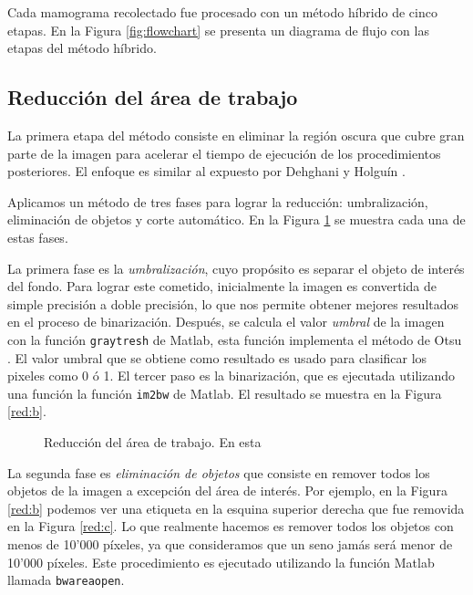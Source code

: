 Cada mamograma recolectado fue procesado con un método híbrido de cinco etapas.
En la Figura \ref{fig:flowchart} se presenta un diagrama de flujo con las
etapas del método híbrido.

\shorthandoff{>} %
    
\shorthandon{>} 

\subsection{Reducción del área de trabajo}

La primera etapa del método consiste en eliminar la región oscura que cubre
gran parte de la imagen para acelerar el tiempo de ejecución de los
procedimientos posteriores. El enfoque es similar al expuesto por Dehghani y
Holguín \cite{dehghani2011method, holguinpre}.

Aplicamos un método de tres fases para lograr la reducción: umbralización,
eliminación de objetos y corte automático. En la Figura \ref{reduction} se
muestra cada una de estas fases. 

La primera fase es la \textit{umbralización}, cuyo propósito es separar el
objeto de interés del fondo. Para lograr este cometido, inicialmente la imagen
es convertida de simple precisión a doble precisión, lo que nos permite obtener
mejores resultados en el proceso de binarización. Después, se calcula el valor
\textit{umbral} de la imagen con la función \texttt{graytresh} de Matlab, esta
función implementa el método de Otsu \cite{otsumethod}. El valor umbral que se
obtiene como resultado es usado para clasificar los pixeles como 0 ó 1. El
tercer paso es la binarización, que es ejecutada utilizando una función la
función \texttt{im2bw} de Matlab. El resultado se muestra en la Figura
\ref{red:b}.

\begin{figure}[h]
    \centering


  \caption[Reducción del área de trabajo]
  {Reducción del área de trabajo. En esta}
  \label{reduction}
\end{figure}

La segunda fase es \textit{eliminación de objetos} que consiste en remover
todos los objetos de la imagen a excepción del área de interés. Por ejemplo, en
la Figura \ref{red:b} podemos ver una etiqueta en la esquina superior derecha
que fue removida en la Figura \ref{red:c}. Lo que realmente hacemos es remover
todos los objetos con menos de 10'000 píxeles, ya que consideramos que un seno
jamás será menor de 10'000 píxeles. Este procedimiento es ejecutado utilizando
la función Matlab llamada \texttt{bwareaopen}.

